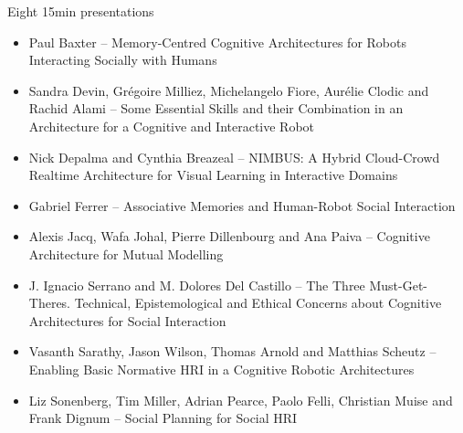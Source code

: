 \documentclass[compress]{beamer}
\begin{document}
\begin{frame}{Eight 15min presentations}
\footnotesize
    \begin{itemize}

\item Paul Baxter -- {\Medium Memory-Centred Cognitive Architectures for Robots
    Interacting Socially with Humans}


\item Sandra Devin, Grégoire Milliez, Michelangelo Fiore, Aurélie Clodic and
    Rachid Alami -- {\Medium Some Essential Skills and their Combination in an
    Architecture for a Cognitive and Interactive Robot}

\item Nick Depalma and Cynthia Breazeal -- {\Medium NIMBUS: A Hybrid
        Cloud-Crowd Realtime Architecture for Visual Learning in Interactive
    Domains}


\item Gabriel Ferrer -- {\Medium Associative Memories and Human-Robot Social
    Interaction}


\item Alexis Jacq, Wafa Johal, Pierre Dillenbourg and Ana Paiva -- {\Medium
    Cognitive Architecture for Mutual Modelling}

\item J. Ignacio Serrano and M. Dolores Del Castillo -- {\Medium The Three
    Must-Get-Theres.  Technical, Epistemological and Ethical Concerns about
    Cognitive Architectures for Social Interaction}

\item Vasanth Sarathy, Jason Wilson, Thomas Arnold and Matthias Scheutz --
    {\Medium Enabling Basic Normative HRI in a Cognitive Robotic Architectures}

\item Liz Sonenberg, Tim Miller, Adrian Pearce, Paolo Felli, Christian Muise and
    Frank Dignum -- {\Medium Social Planning for Social HRI}
    \end{itemize}
\end{frame}
\end{document}
